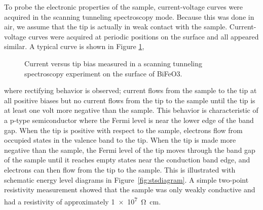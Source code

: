 \documentclass[12pt,%
              twoside,
               letterpaper]{uiothesis}
\begin{document}
To probe the electronic properties of the sample, current-voltage curves were acquired in
the scanning tunneling spectroscopy mode. Because this was done in air, we assume that the
tip is actually in weak contact with the sample. Current-voltage curves were acquired at
periodic positions on the surface and all appeared similar. A typical curve is shown in
Figure \ref{fig:bfofig4},
\begin{figure}
\begin{center}
		\caption[Scanning tunneling spectroscopy measurement of BiFeO3]{%
			Current versus tip bias measured in a scanning tunneling spectroscopy 
	experiment on the surface of BiFeO3.}
	\label{fig:bfofig4}
\end{center}
\end{figure}
where rectifying behavior is observed; current flows from the sample to the tip at all
positive biases but no current flows from the tip to the sample until the tip is at least
one volt more negative than the sample. This behavior is characteristic of a p-type
semiconductor where the Fermi level is near the lower edge of the band gap. When the tip
is positive with respect to the sample, electrons flow from occupied states in the valence
band to the tip. When the tip is made more negative than the sample, the Fermi level of
the tip moves through the band gap of the sample until it reaches empty states near the
conduction band edge, and electrons can then flow from the tip to the sample. This is
illustrated with schematic energy level diagrams in Figure~\ref{fig:stsdiagram}. A simple
two-point resistivity measurement showed that the sample was only weakly conductive and
had a resistivity of approximately \SI{1e7}{\ohm\centi\meter}.
\end{document}
